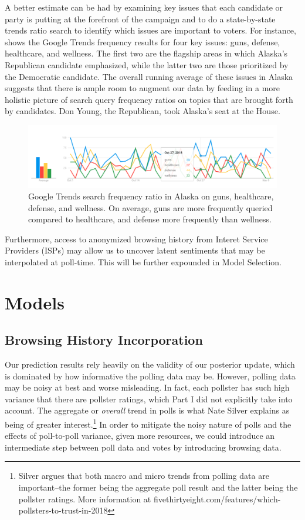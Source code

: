 \documentclass[12pt, letterpaper]{article}
\begin{document}
A better estimate can be had by examining key issues that each candidate or party is putting at the forefront of the campaign and to do a state-by-state trends ratio search to identify which issues are important to voters. For instance,  shows the Google Trends frequency results for four key issues: guns, defense, healthcare, and wellness. The first two are the flagship areas in which Alaska's Republican candidate emphasized, while the latter two are those prioritized by the Democratic candidate. The overall running average of these issues in Alaska suggests that there is ample room to augment our data by feeding in a more holistic picture of search query frequency ratios on topics that are brought forth by candidates. Don Young, the Republican, took Alaska's seat at the House.

\begin{figure}[tbh]
  \centering
  \includegraphics[scale=0.4]{trends_issues}
  \caption{Google Trends search frequency ratio in Alaska on guns, healthcare, defense, and wellness. On average, guns are more frequently queried compared to healthcare, and defense more frequently than wellness.}
  \label{fig:trends_issues}
\end{figure}

Furthermore, access to anonymized browsing history from Interet Service Providers (ISPs) may allow us to uncover latent sentiments that may be interpolated at poll-time. This will be further expounded in Model Selection. 

\section{Models}
\subsection{Browsing History Incorporation}
Our prediction results rely heavily on the validity of our posterior update, which is dominated by how informative the polling data may be. However, polling data may be noisy at best and worse misleading. In fact, each pollster has such high variance that there are pollster ratings, which Part I did not explicitly take into account. The aggregate or \textit{overall} trend in polls is what Nate Silver explains as being of greater interest.\footnote{Silver argues that both macro and micro trends from polling data are important--the former being the aggregate poll result and the latter being the pollster ratings. More information at fivethirtyeight.com/features/which-pollsters-to-trust-in-2018} In order to mitigate the noisy nature of polls and the effects of poll-to-poll variance, given more resources, we could introduce an intermediate step between poll data and votes by introducing browsing data.
\end{document}
